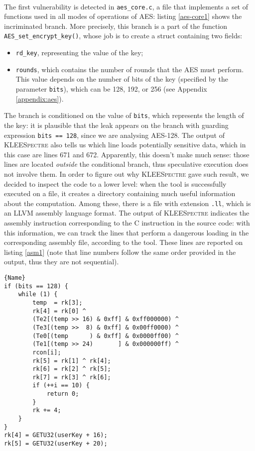 \documentclass[12pt,a4paper]{book}
\theoremstyle{definition}
\begin{document}
	\paragraph{} The first vulnerability is detected in \texttt{aes\_core.c}, a file that implements a set of functions used in all modes of operations of AES: listing \ref{aes-core1} shows the incriminated branch. More precisely, this branch is a part of the function \texttt{AES\_set\_encrypt\_key()}, whose job is to create a struct containing two fields:
	\begin{itemize}
		\item \texttt{rd\_key}, representing the value of the key;
		\item \texttt{rounds}, which contains the number of rounds that the AES must perform. This value depends on the number of bits of the key (specified by the parameter \texttt{bits}), which can be 128, 192, or 256 (see Appendix \ref{appendix:aes}). 
	\end{itemize}
	The branch is conditioned on the value of \texttt{bits}, which represents the length of the key: it is plausible that the leak appears on the branch with guarding expression \texttt{bits == 128}, since we are analysing AES-128. The output of \textsc{KLEESpectre} also tells us which line loads potentially sensitive data, which in this case are lines 671 and 672. Apparently, this doesn't make much sense: those lines are located \textit{outside} the conditional branch, thus speculative execution does not involve them. In order to figure out why \textsc{KLEESpectre} gave such result, we decided to inspect the code to a lower level: when the tool is successfully executed on a file, it creates a directory containing much useful information about the computation. Among these, there is a file with extension \texttt{.ll}, which is an LLVM assembly language format. The output of \textsc{KLEESpectre} indicates the assembly instruction corresponding to the C instruction in the source code: with this information, we can track the lines that perform a dangerous loading in the corresponding assembly file, according to the tool. These lines are reported on listing \ref{asm1} (note that line numbers follow the same order provided in the output, thus they are not sequential).
	
	\begin{minipage}{.75\textwidth}
		\begin{lstlisting}[caption=\texttt{aes\_core.c}, firstnumber=653, label=aes-core1]{Name}
if (bits == 128) {
	while (1) {
		temp  = rk[3];
		rk[4] = rk[0] ^
		(Te2[(temp >> 16) & 0xff] & 0xff000000) ^
		(Te3[(temp >>  8) & 0xff] & 0x00ff0000) ^
		(Te0[(temp      ) & 0xff] & 0x0000ff00) ^
		(Te1[(temp >> 24)       ] & 0x000000ff) ^
		rcon[i];
		rk[5] = rk[1] ^ rk[4];
		rk[6] = rk[2] ^ rk[5];
		rk[7] = rk[3] ^ rk[6];
		if (++i == 10) {
			return 0;
		}
		rk += 4;
	}
}
rk[4] = GETU32(userKey + 16);
rk[5] = GETU32(userKey + 20);
		\end{lstlisting}
	\end{minipage}
	\vspace{3mm}
	
\end{document}
